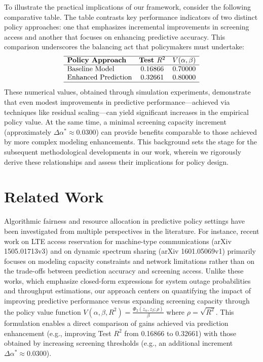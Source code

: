 \documentclass{article}
\begin{document}
To illustrate the practical implications of our framework, consider the following comparative table. The table contrasts key performance indicators of two distinct policy approaches: one that emphasizes incremental improvements in screening access and another that focuses on enhancing predictive accuracy. This comparison underscores the balancing act that policymakers must undertake:
\[
\begin{array}{lcc}
\hline
\textbf{Policy Approach} & \textbf{Test }R^2 & V(\alpha,\beta) \\
\hline
\text{Baseline Model} & 0.16866 & 0.70000 \\
\text{Enhanced Prediction} & 0.32661 & 0.80000 \\
\hline
\end{array}
\]
These numerical values, obtained through simulation experiments, demonstrate that even modest improvements in predictive performance—achieved via techniques like residual scaling—can yield significant increases in the empirical policy value. At the same time, a minimal screening capacity increment (approximately \(\Delta\alpha^* \approx 0.0300\)) can provide benefits comparable to those achieved by more complex modeling enhancements. This background sets the stage for the subsequent methodological developments in our work, wherein we rigorously derive these relationships and assess their implications for policy design.

\section{Related Work}
Algorithmic fairness and resource allocation in predictive policy settings have been investigated from multiple perspectives in the literature. For instance, recent work on LTE access reservation for machine-type communications (arXiv 1505.01713v3) and on dynamic spectrum sharing (arXiv 1601.05069v1) primarily focuses on modeling capacity constraints and network limitations rather than on the trade-offs between prediction accuracy and screening access. Unlike these works, which emphasize closed-form expressions for system outage probabilities and throughput estimations, our approach centers on quantifying the impact of improving predictive performance versus expanding screening capacity through the policy value function \( V(\alpha,\beta,R^2)=\frac{\Phi_2(z_\alpha,z_\beta;\rho)}{\beta} \) where \( \rho = \sqrt{R^2} \). This formulation enables a direct comparison of gains achieved via prediction enhancement (e.g., improving Test \(R^2\) from 0.16866 to 0.32661) with those obtained by increasing screening thresholds (e.g., an additional increment \(\Delta\alpha^* \approx 0.0300\)).
\end{document}
